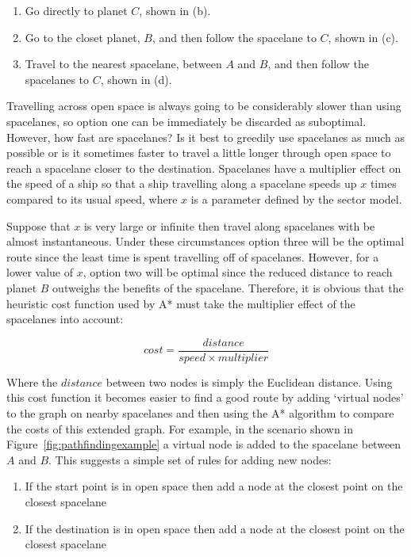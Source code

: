 \begin{enumerate}
	\item Go directly to planet $C$, shown in (b).
	\item Go to the closet planet, $B$, and then follow the spacelane to $C$, shown in (c).
	\item Travel to the nearest spacelane, between $A$ and $B$, and then follow the spacelanes to $C$, shown in (d).
\end{enumerate}

Travelling across open space is always going to be considerably slower than using spacelanes, so option one can be immediately be discarded as suboptimal. However, how fast are spacelanes? Is it best to greedily use spacelanes as much as possible or is it sometimes faster to travel a little longer through open space to reach a spacelane closer to the destination. Spacelanes have a multiplier effect on the speed of a ship so that a ship travelling along a spacelane speeds up $x$ times compared to its usual speed, where $x$ is a parameter defined by the sector model.

Suppose that $x$ is very large or infinite then travel along spacelanes with be almost instantaneous. Under these circumstances option three will be the optimal route since the least time is spent travelling off of spacelanes. However, for a lower value of $x$, option two will be optimal since the reduced distance to reach planet $B$ outweighs the benefits of the spacelane. Therefore, it is obvious that the heuristic cost function used by A* must take the multiplier effect of the spacelanes into account:

\begin{equation*}
	cost = \frac{distance}{speed \times multiplier}
\end{equation*}

Where the $distance$ between two nodes is simply the Euclidean distance. Using this cost function it becomes easier to find a good route by adding `virtual nodes' to the graph on nearby spacelanes and then using the A* algorithm to compare the costs of this extended graph. For example, in the scenario shown in Figure~\ref{fig:pathfindingexample} a virtual node is added to the spacelane between $A$ and $B$. This suggests a simple set of rules for adding new nodes:

\begin{enumerate}
	\item If the start point is in open space then add a node at the closest point on the closest spacelane
	\item If the destination is in open space then add a node at the closest point on the closest spacelane
\end{enumerate}

